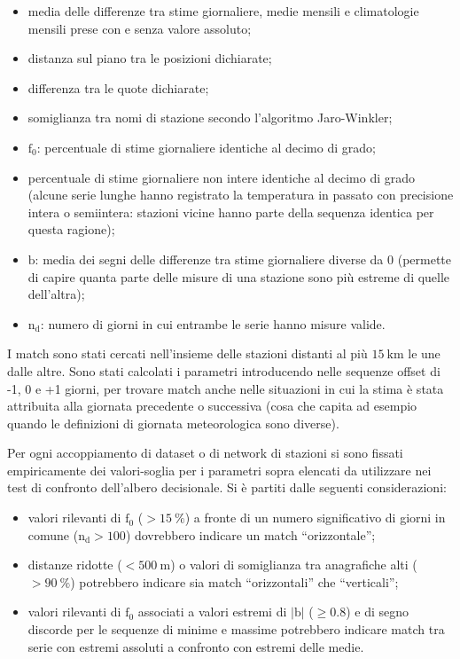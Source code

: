 \begin{itemize}
  \item
    media delle differenze tra stime giornaliere, medie mensili e climatologie mensili prese con e senza valore assoluto;
  \item
    distanza sul piano tra le posizioni dichiarate;
  \item
    differenza tra le quote dichiarate;
  \item
    somiglianza tra nomi di stazione secondo l'algoritmo Jaro-Winkler;
  \item
    \(\mathrm{f}_0\): percentuale di stime giornaliere identiche al decimo di grado;
  \item
    percentuale di stime giornaliere non intere identiche al decimo di grado (alcune serie lunghe hanno registrato la temperatura in passato con precisione intera o semiintera: stazioni vicine hanno parte della sequenza identica per questa ragione);
  \item
    \(\mathrm{b}\): media dei segni delle differenze tra stime giornaliere diverse da 0 (permette di capire quanta parte delle misure di una stazione sono più estreme di quelle dell'altra);
  \item
    \(\mathrm{n_d}\): numero di giorni in cui entrambe le serie hanno misure valide.
\end{itemize}

I match sono stati cercati nell'insieme delle stazioni distanti al più \(15\:\mathrm{km}\) le une dalle altre. Sono stati calcolati i parametri introducendo nelle sequenze offset di -1, 0 e +1 giorni, per trovare match anche nelle situazioni in cui la stima è stata attribuita alla giornata precedente o successiva (cosa che capita ad esempio quando le definizioni di giornata meteorologica sono diverse).

Per ogni accoppiamento di dataset o di network di stazioni si sono fissati empiricamente dei valori-soglia per i parametri sopra elencati da utilizzare nei test di confronto dell'albero decisionale. Si è partiti dalle seguenti considerazioni:

\begin{itemize}
  \item
    valori rilevanti di \(\mathrm{f}_0\) (\(> \qty{15}{\percent}\)) a fronte di un numero significativo di giorni in comune (\(\mathrm{n_d} > 100\)) dovrebbero indicare un match ``orizzontale'';
  \item
    distanze ridotte (\(< 500\:\mathrm{m}\)) o valori di somiglianza tra anagrafiche alti (\(> \qty{90}{\percent}\)) potrebbero indicare sia match ``orizzontali'' che ``verticali'';
  \item
    valori rilevanti di \(\mathrm{f}_0\) associati a valori estremi di \(|\mathrm{b}|\) (\(\ge 0.8\)) e di segno discorde per le sequenze di minime e massime potrebbero indicare match tra serie con estremi assoluti a confronto con estremi delle medie.
\end{itemize}

